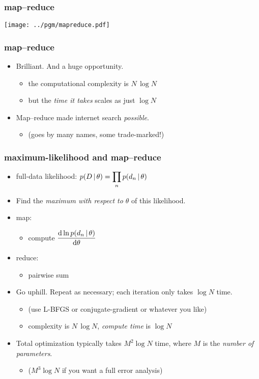 \documentclass[pdftex]{beamer}
\begin{document}
\begin{frame}
  \frametitle{map--reduce}
  \texttt{[image: ../pgm/mapreduce.pdf]}
\end{frame}

\begin{frame}
  \frametitle{map--reduce}
  \begin{itemize}
  \item Brilliant.  And a huge opportunity.
    \begin{itemize}
    \item the computational complexity is $N\,\log N$
    \item but the \emph{time it takes} scales as just $\log N$
    \end{itemize}
  \item Map--reduce made internet search \emph{possible}.
    \begin{itemize}
    \item (goes by many names, some trade-marked!)
    \end{itemize}
  \end{itemize}
\end{frame}

\begin{frame}
  \frametitle{maximum-likelihood and map--reduce}
  \begin{itemize}
  \item full-data likelihood: $\displaystyle p(D\,|\,\theta) =
    \prod_n p(d_n\,|\,\theta)$
  \item Find the \emph{maximum with respect to $\theta$} of this
    likelihood.
  \item map:
    \begin{itemize}
    \item compute $\displaystyle\frac{\mathrm{d} \ln p(d_n\,|\,\theta)}{\mathrm{d}\theta}$
    \end{itemize}
  \item reduce:
    \begin{itemize}
    \item pairwise sum
    \end{itemize}
  \item Go uphill.  Repeat as necessary; each iteration only takes
    $\log N$ time.
    \begin{itemize}
    \item (use L-BFGS or conjugate-gradient or whatever you like)
    \item complexity is $N\,\log N$, \emph{compute time} is $\log N$
    \end{itemize}
  \item Total optimization typically takes $M^2\log N$ time, where $M$ is the \emph{number of parameters}.
    \begin{itemize}
    \item ($M^3\log N$ if you want a full error analysis)
    \end{itemize}
  \end{itemize}
\end{frame}
\end{document}
